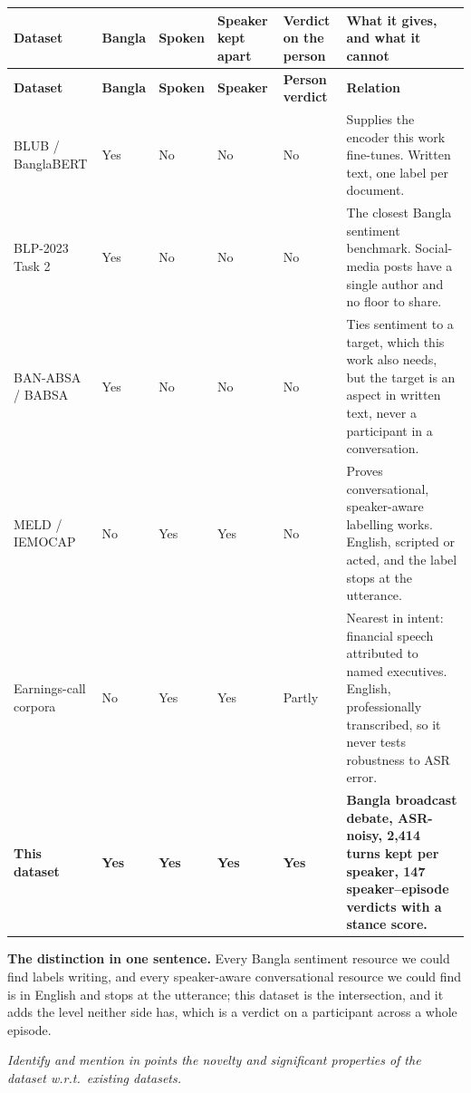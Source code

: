 \documentclass[11pt,a4paper]{article}
\newcommand{\thd}[1]{\textbf{\sffamily\small #1}}          %
\begin{document}
\begin{longtable}{|L{3.0cm}|L{1.5cm}|L{1.3cm}|L{1.6cm}|L{1.7cm}|L{4.4cm}|}
\hline
\thd{Dataset} & \thd{Bangla} & \thd{Spoken} & \thd{Speaker kept apart} & \thd{Verdict on the person} & \thd{What it gives, and what it cannot} \\ \hline
\endfirsthead
\hline \thd{Dataset} & \thd{Bangla} & \thd{Spoken} & \thd{Speaker} & \thd{Person verdict} & \thd{Relation} \\ \hline \endhead
BLUB / BanglaBERT \cite{banglabert} & Yes & No & No & No & Supplies the encoder this work fine-tunes. Written text, one label per document. \\ \hline
BLP-2023 Task 2 \cite{blp2023} & Yes & No & No & No & The closest Bangla sentiment benchmark. Social-media posts have a single author and no floor to share. \\ \hline
BAN-ABSA \cite{banabsa} / BABSA \cite{babsa} & Yes & No & No & No & Ties sentiment to a target, which this work also needs, but the target is an aspect in written text, never a participant in a conversation. \\ \hline
MELD / IEMOCAP \cite{erc} & No & Yes & Yes & No & Proves conversational, speaker-aware labelling works. English, scripted or acted, and the label stops at the utterance. \\ \hline
Earnings-call corpora \cite{earnings} & No & Yes & Yes & Partly & Nearest in intent: financial speech attributed to named executives. English, professionally transcribed, so it never tests robustness to ASR error. \\ \hline
\textbf{This dataset} & \textbf{Yes} & \textbf{Yes} & \textbf{Yes} & \textbf{Yes} & \textbf{Bangla broadcast debate, ASR-noisy, 2{,}414 turns kept per speaker, 147 speaker--episode verdicts with a stance score.} \\ \hline
\end{longtable}
\addtocounter{table}{-1}

\vspace{2pt}
\textbf{The distinction in one sentence.} Every Bangla sentiment resource we could find labels
writing, and every speaker-aware conversational resource we could find is in English and stops at
the utterance; this dataset is the intersection, and it adds the level neither side has, which is
a verdict on a participant across a whole episode.

\emph{\small Identify and mention in points the novelty and significant properties of the dataset
w.r.t.\ existing datasets.}
\end{document}
